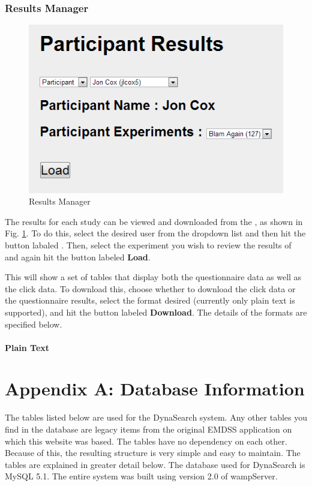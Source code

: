 \documentclass[article]{ij4uq}              %
\begin{document}
\subsubsection {Results Manager}

\begin{figure}[h!]
 \centering
 \includegraphics[width=5.0in]{figures/part_results.png}
 \caption{Results Manager}
 \label{fig:partResults}
\end{figure}
\FloatBarrier

The results for each study can be viewed and downloaded from the , as shown in Fig. \ref{fig:partResults}.  To do this, select the desired user from the dropdown list and then hit the button labaled .  Then, select the experiment you wish to review the results of and again hit the button labeled \textbf{Load}.

This will show a set of tables that display both the questionnaire data as well as the click data.  To download this, choose whether to download the click data or the questionnaire results, select the format desired (currently only plain text is supported), and hit the button labeled \textbf{Download}.  The details of the formats are specified below.

\paragraph{Plain Text}


\section{Appendix A: Database Information}
The tables listed below are used for the DynaSearch system. Any other tables you find in the database are legacy items from the original EMDSS application on which this website was based. The tables have no dependency on each other. Because of this, the resulting structure is very simple and easy to maintain. The tables are explained in greater detail below. The database used for DynaSearch is MySQL 5.1. The entire system was built using version 2.0 of wampServer.
\end{document}
